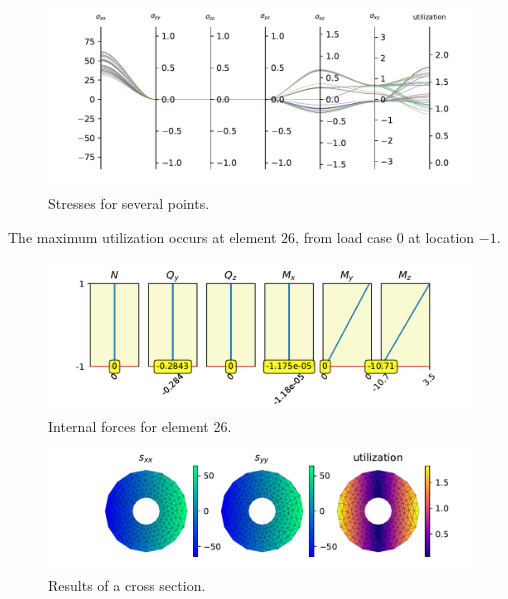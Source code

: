 \documentclass{article}%
\begin{document}
\begin{figure}[h!]%
\centering%
\includegraphics[width=\textwidth]{bernoulli_B2_parallel_1.pdf}%
\caption{Stresses for several points.}%
\end{figure}

%
The maximum utilization occurs at element $26$, from load case $0$ at location $-1$.%


\begin{figure}[h!]%
\centering%
\includegraphics[width=\textwidth]{bernoulli_B2_parallel_2.pdf}%
\caption{Internal forces for element 26.}%
\end{figure}

%


\begin{figure}[h!]%
\centering%
\includegraphics[width=\textwidth]{cross section results.pdf}%
\caption{Results of a cross section.}%
\end{figure}

%
\newpage

%
\end{document}
